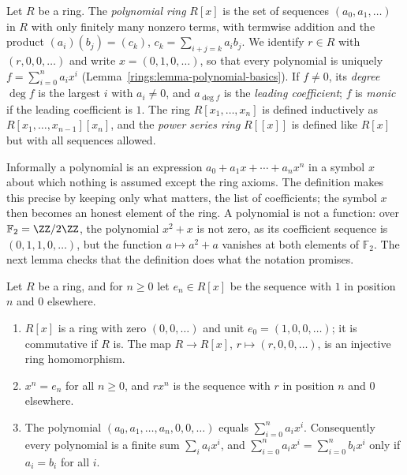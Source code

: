 \begin{definition}\label{rings:definition-polynomials}
Let $R$ be a ring. The \emph{polynomial ring} $R[x]$ is the set of sequences
$(a_0, a_1, \ldots)$ in $R$ with only finitely many nonzero terms, with termwise
addition and the product $(a_i)(b_j) = (c_k)$, $c_k = \sum_{i + j = k} a_i b_j$. We
identify $r \in R$ with $(r, 0, 0, \ldots)$ and write $x = (0, 1, 0, \ldots)$, so that
every polynomial is uniquely $f = \sum_{i=0}^n a_i x^i$ (Lemma~\ref{rings:lemma-polynomial-basics}). If $f \neq 0$, its
\emph{degree} $\deg f$ is the largest $i$ with $a_i \neq 0$, and $a_{\deg f}$ is the
\emph{leading coefficient}; $f$ is \emph{monic} if the leading coefficient is $1$. The
ring $R[x_1, \ldots, x_n]$ is defined inductively as $R[x_1, \ldots, x_{n-1}][x_n]$, and the
\emph{power series ring} $R[[x]]$ is defined like $R[x]$ but with all sequences allowed.
\end{definition}

Informally a polynomial is an expression $a_0 + a_1x + \cdots + a_nx^n$ in a symbol $x$ about which nothing is assumed except the ring axioms. The definition makes this precise by keeping only what
matters, the list of coefficients; the symbol $x$ then becomes an honest element of the ring. A polynomial is not a function: over $\mathbb{F}_2 = \ZZ/2\ZZ$, the polynomial $x^2 + x$ is not zero, as its coefficient
sequence is $(0, 1, 1, 0, \ldots)$, but the function $a \mapsto a^2 + a$ vanishes at both elements of $\mathbb{F}_2$. The next lemma checks that the definition does what the notation promises.

\begin{lemma}\label{rings:lemma-polynomial-basics}
Let $R$ be a ring, and for $n \geq 0$ let $e_n \in R[x]$ be the sequence with $1$ in position $n$ and $0$ elsewhere.
\begin{enumerate}
\item $R[x]$ is a ring with zero $(0, 0, \ldots)$ and unit $e_0 = (1, 0, 0, \ldots)$; it is commutative if $R$ is. The map $R \to R[x]$, $r \mapsto (r, 0, 0, \ldots)$, is an injective ring homomorphism.
\item $x^n = e_n$ for all $n \geq 0$, and $r x^n$ is the sequence with $r$ in position $n$ and $0$ elsewhere.
\item The polynomial $(a_0, a_1, \ldots, a_n, 0, 0, \ldots)$ equals $\sum_{i=0}^na_ix^i$. Consequently every polynomial is a finite sum $\sum_ia_ix^i$, and $\sum_{i=0}^na_ix^i = \sum_{i=0}^nb_ix^i$ only if $a_i = b_i$ for all $i$.
\end{enumerate}
\end{lemma}

